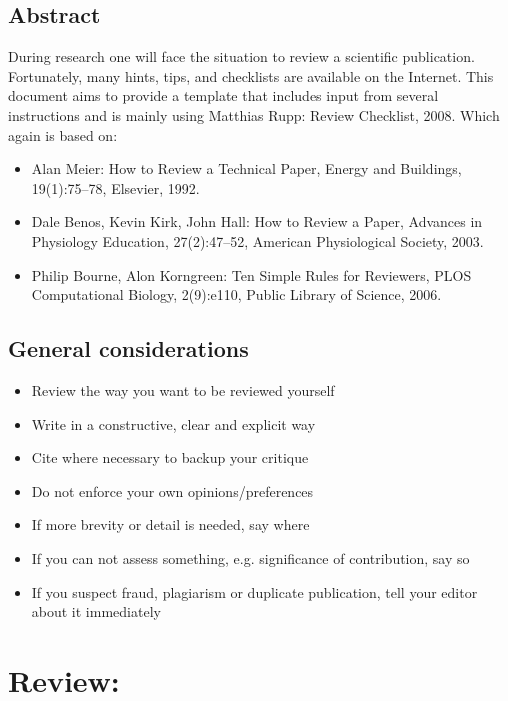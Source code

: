 

\section*{Abstract}
During research one will face the situation to review a scientific publication.
Fortunately, many hints, tips, and checklists are available on the Internet.
This document aims to provide a template that includes input from several instructions and is mainly using Matthias Rupp: Review Checklist, 2008.
Which again is based on:
\begin{itemize}
    \item Alan Meier: How to Review a Technical Paper, Energy and Buildings, 19(1):75–78, Elsevier, 1992.
    \item Dale Benos, Kevin Kirk, John Hall: How to Review a Paper, Advances in Physiology Education, 27(2):47–52, American Physiological Society, 2003.
    \item Philip Bourne, Alon Korngreen: Ten Simple Rules for Reviewers, PLOS Computational Biology, 2(9):e110, Public Library of Science, 2006.
\end{itemize}

\section*{General considerations}
\begin{itemize}
    \item Review the way you want to be reviewed yourself
    \item Write in a constructive, clear and explicit way
    \item Cite where necessary to backup your critique
    \item Do not enforce your own opinions/preferences
    \item If more brevity or detail is needed, say where
    \item If you can not assess something, e.g. significance of contribution, say so
    \item If you suspect fraud, plagiarism or duplicate publication, tell your editor about it immediately
\end{itemize}

\chapter*{Review: \textcolor{HighlightColor}{\metaTitle}}\label{sec:review}\vspace{.5cm}
\setcounter{chapter}{1}


